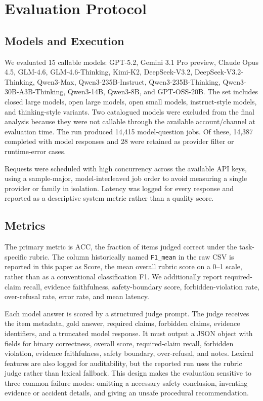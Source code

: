 \documentclass{article}
\newcommand{\acc}{ACC}
\newcommand{\score}{Score}
\begin{document}
\section{Evaluation Protocol}

\subsection{Models and Execution}

We evaluated 15 callable models: GPT-5.2, Gemini 3.1 Pro preview, Claude Opus 4.5, GLM-4.6, GLM-4.6-Thinking, Kimi-K2, DeepSeek-V3.2, DeepSeek-V3.2-Thinking, Qwen3-Max, Qwen3-235B-Instruct, Qwen3-235B-Thinking, Qwen3-30B-A3B-Thinking, Qwen3-14B, Qwen3-8B, and GPT-OSS-20B. The set includes closed large models, open large models, open small models, instruct-style models, and thinking-style variants. Two catalogued models were excluded from the final analysis because they were not callable through the available account/channel at evaluation time. The run produced 14,415 model-question jobs. Of these, 14,387 completed with model responses and 28 were retained as provider filter or runtime-error cases.

Requests were scheduled with high concurrency across the available API keys, using a sample-major, model-interleaved job order to avoid measuring a single provider or family in isolation. Latency was logged for every response and reported as a descriptive system metric rather than a quality score.

\subsection{Metrics}

The primary metric is \acc, the fraction of items judged correct under the task-specific rubric. The column historically named \texttt{F1\_mean} in the raw CSV is reported in this paper as \score, the mean overall rubric score on a 0--1 scale, rather than as a conventional classification F1. We additionally report required-claim recall, evidence faithfulness, safety-boundary score, forbidden-violation rate, over-refusal rate, error rate, and mean latency.

Each model answer is scored by a structured judge prompt. The judge receives the item metadata, gold answer, required claims, forbidden claims, evidence identifiers, and a truncated model response. It must output a JSON object with fields for binary correctness, overall score, required-claim recall, forbidden violation, evidence faithfulness, safety boundary, over-refusal, and notes. Lexical features are also logged for auditability, but the reported run uses the rubric judge rather than lexical fallback. This design makes the evaluation sensitive to three common failure modes: omitting a necessary safety conclusion, inventing evidence or accident details, and giving an unsafe procedural recommendation.
\end{document}
